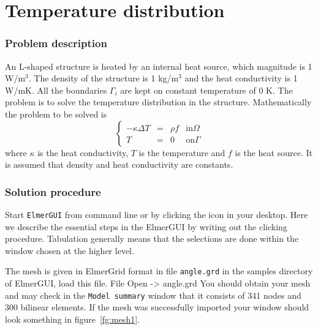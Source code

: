 \chapter{Temperature distribution} %


\subsection*{Problem description}

An L-shaped structure 
is heated by an
internal heat source, which magnitude is 1 W/m$^3$. The density of the
structure is 1 kg/m$^3$ and the heat conductivity is 1 W/mK. All the
boundaries $\Gamma_i$ are kept on constant temperature of 0 K. The
problem is to solve the temperature distribution in the structure.
Mathematically the problem to be solved is
\begin{equation}
\left \{
\begin{array}{cccc}
- \kappa \Delta T &= &\rho f & \mathrm{ in } \Omega \\
T&=&0 & \mathrm{ on } \Gamma
\end{array}
\right .
\end{equation}
where $\kappa$ is the heat conductivity, $T$  is the temperature 
and $f$ is the heat source. It is assumed that density 
and heat conductivity are constants. 


\subsection*{Solution procedure}

Start \texttt{ElmerGUI} from command line or by clicking the icon in your desktop. Here we describe 
the essential steps in the ElmerGUI by writing out the clicking procedure. Tabulation generally means that the 
selections are done within the window chosen at the higher level. 

The mesh is given in ElmerGrid format in file \texttt{angle.grd} in the samples directory of ElmerGUI, 
load this file.
\ttbegin
File 
  Open -> angle.grd
\ttend
You should obtain your mesh and may check in the \texttt{Model summary} 
window that it consists of 341 nodes and 300 bilinear elements.
If the mesh was successfully imported your window should look something in figure~\ref{fg:mesh1}.

